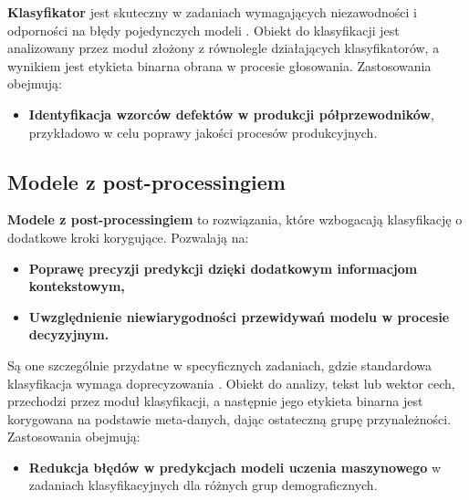 \textbf{Klasyfikator} jest skuteczny w zadaniach wymagających niezawodności i odporności na błędy pojedynczych modeli \cite{VotingClassifier}. Obiekt do klasyfikacji jest analizowany przez moduł złożony z równolegle działających klasyfikatorów, a wynikiem jest etykieta binarna obrana w procesie głosowania. Zastosowania obejmują:
\begin{itemize}
	\item
	      \textbf{Identyfikacja wzorców defektów w produkcji półprzewodników}, przykładowo w celu poprawy jakości procesów produkcyjnych.
\end{itemize}

\subsection{Modele z post-processingiem}
\textbf{Modele z post-processingiem} to rozwiązania, które wzbogacają klasyfikację o dodatkowe kroki korygujące. Pozwalają na:
\begin{itemize}
	\item
	      \textbf{Poprawę precyzji predykcji dzięki dodatkowym informacjom kontekstowym,}
	\item
	      \textbf{Uwzględnienie niewiarygodności przewidywań modelu w procesie decyzyjnym.}
\end{itemize}

Są one szczególnie przydatne w specyficznych zadaniach, gdzie standardowa klasyfikacja wymaga doprecyzowania \cite{postprocessing}. Obiekt do analizy, tekst lub wektor cech, przechodzi przez moduł klasyfikacji, a następnie jego etykieta binarna jest korygowana na podstawie meta-danych, dając ostateczną grupę przynależności. Zastosowania obejmują:

\begin{itemize}
	\item
	      \textbf{Redukcja błędów w predykcjach modeli uczenia maszynowego} w zadaniach klasyfikacyjnych dla różnych grup demograficznych.
\end{itemize}

